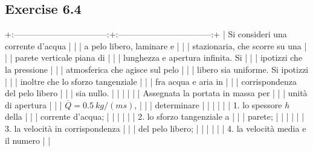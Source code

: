 \documentclass[letterpaper,10pt,italian]{jupyterBook}
\begin{document}
\subsection{Exercise 6.4}
\label{\detokenize{polimi/fluidmechanics-ita/template/capitoli/06_slnEsatte/0603in:exercise-6-4}}\label{\detokenize{polimi/fluidmechanics-ita/template/capitoli/06_slnEsatte/0603in:fluid-mechanics-exact-solutions-ex04}}\label{\detokenize{polimi/fluidmechanics-ita/template/capitoli/06_slnEsatte/0603in::doc}}
\sphinxAtStartPar
+:———————————:+:———————————:+
| Si consideri una corrente d’acqua |                                   |
| a pelo libero, laminare e         |                                   |
| stazionaria, che scorre su una    |                                   |
| parete verticale piana di         |                                   |
| lunghezza e apertura infinita. Si |                                   |
| ipotizzi che la pressione         |                                   |
| atmosferica che agisce sul pelo   |                                   |
| libero sia uniforme. Si ipotizzi  |                                   |
| inoltre che lo sforzo tangenziale |                                   |
| fra acqua e aria in               |                                   |
| corrispondenza del pelo libero    |                                   |
| sia nullo.                        |                                   |
|                                   |                                   |
| Assegnata la portata in massa per |                                   |
| unità di apertura                 |                                   |
| \(\overline{Q}=0.5\ kg/(ms)\),      |                                   |
| determinare                       |                                   |
|                                   |                                   |
| 1.  lo spessore \(h\) della         |                                   |
|     corrente d’acqua;             |                                   |
|                                   |                                   |
| 2.  lo sforzo tangenziale a       |                                   |
|     parete;                       |                                   |
|                                   |                                   |
| 3.  la velocità in corrispondenza |                                   |
|     del pelo libero;              |                                   |
|                                   |                                   |
| 4.  la velocità media e il numero |                                   |
\end{document}
